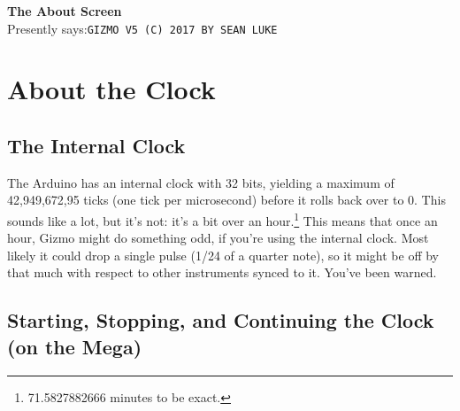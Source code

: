 \documentclass{article}
\begin{document}
\begin{description}
		
	\item{\bf The About Screen}\\
		Presently says:\quad \texttt{GIZMO V5 (C) 2017 BY SEAN LUKE}
	\end{description}

\clearpage
	\section{About the Clock}

	\subsection{The Internal Clock}
	\label{internalclock}

The Arduino has an internal clock with 32 bits, yielding a maximum of 42,949,672,95 ticks (one tick per microsecond) before it rolls back over to 0.  This sounds like a lot, but it's not: it's a bit over an hour.\footnote{71.5827882666 minutes to be exact.}  This means that once an hour, Gizmo might do something odd, if you're using the internal clock.  Most likely it could drop a single pulse (1/24 of a quarter note), so it might be off by that much with respect to other instruments synced to it.  You've been warned.

\subsection{Starting, Stopping, and Continuing the Clock (on the Mega)}
	\label{startingclock}
\end{document}
